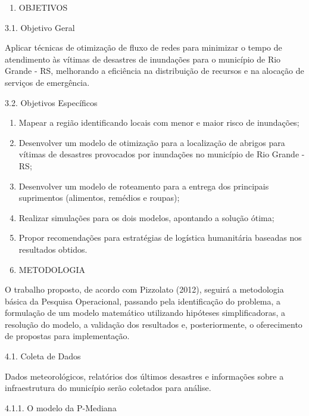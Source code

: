 \documentclass[
]{article}
\providecommand{\tightlist}{%
  \setlength{\itemsep}{0pt}\setlength{\parskip}{0pt}}
\begin{document}
\begin{enumerate}
\def\labelenumi{\arabic{enumi}.}
\setcounter{enumi}{2}
\tightlist
\item
  OBJETIVOS
\end{enumerate}

3.1. Objetivo Geral

Aplicar técnicas de otimização de fluxo de redes para minimizar o tempo
de atendimento às vítimas de desastres de inundações para o município de
Rio Grande - RS, melhorando a eficiência na distribuição de recursos e
na alocação de serviços de emergência.

3.2. Objetivos Específicos

\begin{enumerate}
\def\labelenumi{\arabic{enumi}.}
\item
  Mapear a região identificando locais com menor e maior risco de
  inundações;
\item
  Desenvolver um modelo de otimização para a localização de abrigos para
  vítimas de desastres provocados por inundações no município de Rio
  Grande - RS;
\item
  Desenvolver um modelo de roteamento para a entrega dos principais
  suprimentos (alimentos, remédios e roupas);
\item
  Realizar simulações para os dois modelos, apontando a solução ótima;
\item
  Propor recomendações para estratégias de logística humanitária
  baseadas nos resultados obtidos.
\item
  METODOLOGIA
\end{enumerate}

O trabalho proposto, de acordo com Pizzolato (2012), seguirá a
metodologia básica da Pesquisa Operacional, passando pela identificação
do problema, a formulação de um modelo matemático utilizando hipóteses
simplificadoras, a resolução do modelo, a validação dos resultados e,
posteriormente, o oferecimento de propostas para implementação.

4.1. Coleta de Dados

Dados meteorológicos, relatórios dos últimos desastres e informações
sobre a infraestrutura do município serão coletados para análise.

4.1.1. O modelo da P-Mediana
\end{document}
